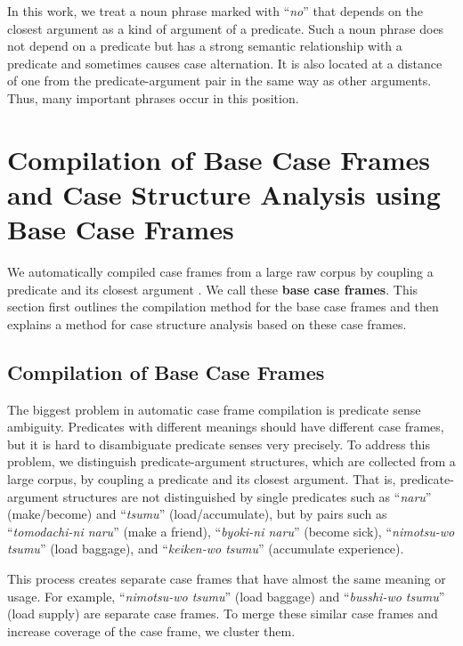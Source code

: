 \documentclass[english]{jnlp_1.4_rep}
\begin{document}
In this work, we treat a noun phrase marked with 
``\textit{no}'' that depends on the closest argument as a kind of argument
of a predicate. Such a noun phrase does not depend on a predicate but
has a strong semantic relationship with a predicate and sometimes causes 
case alternation. It is also located at a distance of one from
the predicate-argument pair in the same way as other
arguments. Thus, many important phrases occur in this position.


\section{Compilation of Base Case Frames and Case Structure Analysis using Base Case Frames}

We automatically compiled case frames from a large raw corpus by
coupling a predicate and its closest argument \cite{Kawahara2001}. We
call these \textbf{base case frames}. This section first
outlines the compilation method for the base case
frames and then explains a method for case structure analysis based on
these case frames.


\subsection{Compilation of Base Case Frames}
\label{Section::1次格フレーム辞書の構築}

The biggest problem in automatic case frame compilation is predicate
sense ambiguity. Predi\-cates with different meanings should have
different case frames, but it is hard to disambiguate predicate senses
very precisely. To address this problem, we distinguish
predicate-argument structures, which are collected from a large corpus,
by coupling a predicate and its closest argument. That is,
predicate-argument structures are not distinguished by single predicates
such as ``\textit{naru}'' (make/become) and ``\textit{tsumu}''
(load/accumulate), but by pairs such as ``\textit{tomodachi-ni naru}'' (make a
friend), ``\textit{byoki-ni naru}'' (become sick), ``\textit{nimotsu-wo tsumu}'' (load baggage),
and ``\textit{keiken-wo tsumu}'' (accumulate experience).

This process creates separate case frames that have almost the same
meaning or usage. For example, ``\textit{nimotsu-wo tsumu}'' (load
baggage) and ``\textit{busshi-wo tsumu}'' (load supply) are separate
case frames. To merge these similar case frames and increase coverage of
the case frame, we cluster them.
\end{document}
